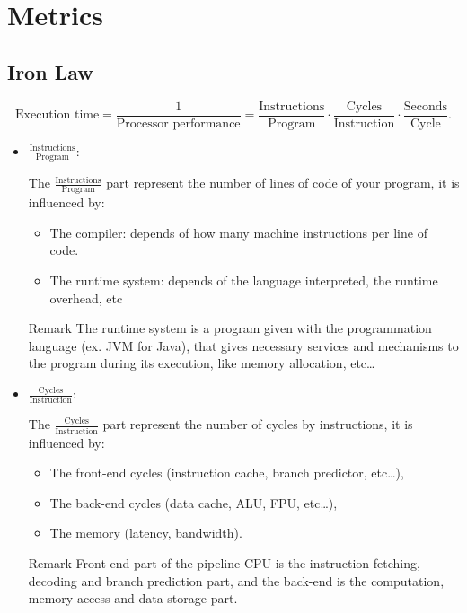 \section{Metrics}
\subsection{Iron Law}
    \begin{tcolorbox}[rouge]
        \[\text{Execution time}= \frac{1}{\text{Processor performance}}= \frac{\text{Instructions}}{\text{Program}} \cdot \frac{\text{Cycles}}{\text{Instruction}} \cdot \frac{\text{Seconds}}{\text{Cycle}}.\]
    \end{tcolorbox}
    \begin{itemize}[left=10pt, label=\textbullet]
        \item \textbf{$\frac{\text{Instructions}}{\text{Program}}$}:
            \begin{tcolorbox}[gris]
                The $\frac{\text{Instructions}}{\text{Program}}$ part represent the number of lines of code of your program, it is influenced by: 
                \begin{itemize}[left=10pt]
                    \item The compiler: depends of how many machine instructions per line of code. 
                    \item The runtime system: depends of the language interpreted, the runtime overhead, etc
                \end{itemize}
                \begin{remark}{Remark}
                    The runtime system is a program given with the programmation language (ex. JVM for Java), that gives necessary services and mechanisms to the program during its execution, like memory allocation, etc\ldots
                \end{remark}
            \end{tcolorbox} 
        \item \textbf{$\frac{\text{Cycles}}{\text{Instruction}}$}:
            \begin{tcolorbox}[gris] The $\frac{\text{Cycles}}{\text{Instruction}}$ part represent the number of cycles by instructions, it is influenced by: \begin{itemize}[left=10pt] \item The front-end cycles (instruction cache, branch predictor, etc\ldots), \item The back-end cycles (data cache, ALU, FPU, etc\ldots), \item  The memory (latency, bandwidth).
                \end{itemize}
                \begin{remark}{Remark}
                    Front-end part of the pipeline CPU is the instruction fetching, decoding and branch prediction part, and the back-end is the computation, memory access and data storage part.
                    

\end{remark}
\end{tcolorbox}
\end{itemize}
